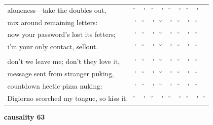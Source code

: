\documentclass[12pt, landscape]{article}
\begin{document}
\begin{center}
\begin{tabularx}{\textwidth}{
>{\lefting\arraybackslash}X
c
c
c
c
c
c
c
c
c
}

aloneness---take the doubles out, & \u{} & \'{} & \u{} & \'{} & \u{} & \'{} & \u{} & \'{} & \\
mix around remaining letters:  & \'{} & \u{} & \'{} & \u{} & \'{} & \u{} & \'{} & \u{} & \\
now your password's lost its fetters; & \'{} & \u{} & \'{} & \u{} & \'{} & \u{} & \'{} & \u{} & \\
i'm your only contact, sellout. & \'{} & \u{} & \'{} & \u{} & \'{} & \u{} & \'{} & \u{} & \\
 & & & & & & & & \\
don't we leave me; don't they love it,  & \'{} & \u{} & \'{} & \u{} & \'{} & \u{} & \'{} & \u{} & \\
message sent from stranger puking, & \'{} & \u{} & \'{} & \u{} & \'{} & \u{} & \'{} & \u{} & \\
countdown hectic pizza nuking:  & \'{} & \u{} & \'{} & \u{} & \'{} & \u{} & \'{} & \u{} & \\
Digiorno scorched my tongue, so kiss it. & \u{} & \'{} & \u{} & \'{} & \u{} & \'{} & \u{} & \'{} & \u{} \\

\end{tabularx}
\end{center}

\vspace*{\fill}

\newpage

\vspace*{\fill}

\noindent \textbf{causality 63}
\noindent \hfill \par
\end{document}
